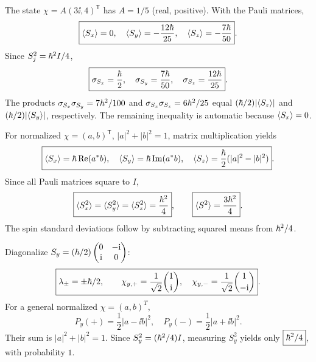 The state $\chi=A(3\ii,4)^{\mathsf T}$
has $A=1/5$ (real, positive).
With the Pauli matrices,
\begin{equation}
\boxed{\langle S_x\rangle=0,\quad
\langle S_y\rangle=-\frac{12\hbar}{25},\quad
\langle S_z\rangle=-\frac{7\hbar}{50}}.
\end{equation}
Since $S_j^2=\hbar^2I/4$,
\begin{equation}
\boxed{\sigma_{S_x}=\frac{\hbar}2,\quad
\sigma_{S_y}=\frac{7\hbar}{50},\quad
\sigma_{S_z}=\frac{12\hbar}{25}}.
\end{equation}
The products
$\sigma_{S_x}\sigma_{S_y}=7\hbar^2/100$ and
$\sigma_{S_x}\sigma_{S_z}=6\hbar^2/25$
equal $(\hbar/2)|\langle S_z\rangle|$
and $(\hbar/2)|\langle S_y\rangle|$, respectively.
The remaining inequality is automatic because
$\langle S_x\rangle=0$.

For normalized $\chi=(a,b)^{\mathsf T}$,
$|a|^2+|b|^2=1$, matrix multiplication yields
\begin{equation}
\boxed{\langle S_x\rangle=\hbar\,\mathrm{Re}(a^*b),\quad
\langle S_y\rangle=\hbar\,\mathrm{Im}(a^*b),\quad
\langle S_z\rangle=\frac{\hbar}2(|a|^2-|b|^2)}.
\end{equation}
Since all Pauli matrices square to $I$,
\begin{equation}
\boxed{\langle S_x^2\rangle=\langle S_y^2\rangle=\langle S_z^2\rangle
=\frac{\hbar^2}{4}},\qquad
\boxed{\langle S^2\rangle=\frac{3\hbar^2}{4}}.
\end{equation}
The spin standard deviations follow by
subtracting squared means from $\hbar^2/4$.

Diagonalize
$S_y=(\hbar/2)\begin{pmatrix}0&-\mathrm i\\\mathrm i&0\end{pmatrix}$:
\begin{equation}
\boxed{\lambda_\pm=\pm\hbar/2,\qquad
\chi_{y,+}=\frac1{\sqrt2}\binom{1}{\mathrm i},
\quad\chi_{y,-}=\frac1{\sqrt2}\binom{1}{-\mathrm i}}.
\end{equation}
For a general normalized $\chi=(a,b)^T$,
\begin{equation}
\boxed{P_y(+)=\frac12|a-\ii b|^2,\quad
P_y(-)=\frac12|a+\ii b|^2}.
\end{equation}
Their sum is $|a|^2+|b|^2=1$.
Since $S_y^2=(\hbar^2/4)I$, measuring
$S_y^2$ yields only $\boxed{\hbar^2/4}$,
with probability $1$.

